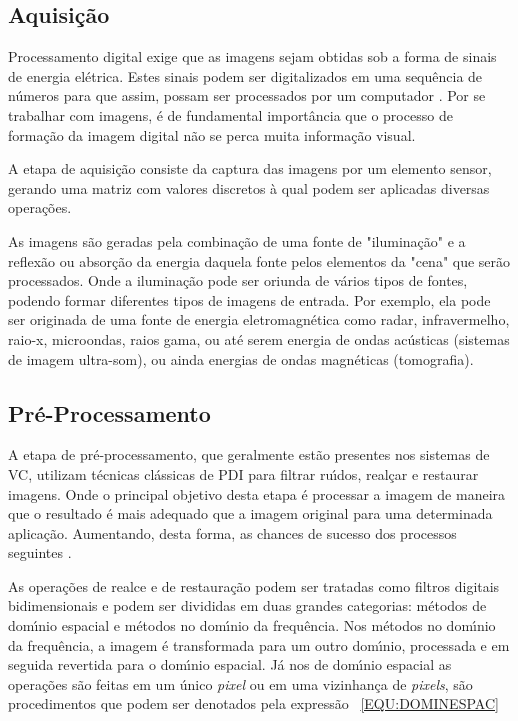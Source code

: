 \subsection{Aquisi\c{c}\~{a}o}

Processamento digital exige que as imagens sejam obtidas sob a forma de sinais de energia el\'{e}trica. Estes sinais podem ser digitalizados em uma sequ\^{e}ncia de n\'{u}meros para que assim, possam ser processados por um computador \cite{JAHNE:2005}. Por se trabalhar com imagens, \'{e} de fundamental import\^{a}ncia que o processo de forma\c{c}\~{a}o da imagem digital n\~{a}o se perca muita informa\c{c}\~{a}o visual\cite{BOVIK:2009}.

A etapa de aquisi\c{c}\~{a}o consiste da captura das imagens por um elemento sensor, gerando uma matriz com valores discretos \`{a} qual podem ser aplicadas diversas opera\c{c}\~{o}es\cite{GONZALEZ:2008}.

As imagens s\~{a}o geradas pela combina\c{c}\~{a}o de uma fonte de "ilumina\c{c}\~{a}o" e a reflex\~{a}o ou absor\c{c}\~{a}o da energia daquela fonte pelos elementos da "cena" que ser\~{a}o processados. Onde a ilumina\c{c}\~{a}o pode ser oriunda de v\'{a}rios tipos de fontes, podendo formar diferentes tipos de imagens de entrada. Por exemplo, ela pode ser originada de uma fonte de energia eletromagn\'{e}tica como radar, infravermelho, raio-x, microondas, raios gama, ou at\'{e} serem energia de ondas ac\'{u}sticas (sistemas de imagem ultra-som), ou ainda energias de ondas magn\'{e}ticas (tomografia)\cite{GONZALEZ:2007}\cite{AUZUIR:2005}.

\subsection{Pr\'{e}-Processamento}

A etapa de pr\'{e}-processamento, que geralmente est\~{a}o presentes nos sistemas de \ac{VC}, utilizam t\'{e}cnicas cl\'{a}ssicas de \ac{PDI} para filtrar ru\'{\i}dos, real\c{c}ar e restaurar imagens. Onde o principal objetivo desta etapa \'{e} processar a imagem de maneira que o resultado \'{e} mais adequado que a imagem original para uma determinada aplica\c{c}\~{a}o. Aumentando, desta forma, as chances de sucesso dos processos seguintes \cite{GONZALEZ:2007}.

As opera\c{c}\~{o}es de realce e de restaura\c{c}\~{a}o podem ser tratadas como filtros digitais bidimensionais e podem ser divididas em duas grandes categorias: m\'{e}todos de dom\'{\i}nio espacial e m\'{e}todos no dom\'{\i}nio da frequ\^{e}ncia. Nos m\'{e}todos no dom\'{\i}nio da frequ\^{e}ncia, a imagem \'{e} transformada para um outro dom\'{\i}nio, processada e em seguida revertida para o dom\'{\i}nio espacial. J\'{a} nos de dom\'{\i}nio espacial as opera\c{c}\~{o}es s\~{a}o feitas em um \'{u}nico \emph{pixel} ou em uma vizinhan\c{c}a de \emph{pixels}, s\~{a}o procedimentos que podem ser denotados pela express\~{a}o ~\ref{EQU:DOMINESPAC}

